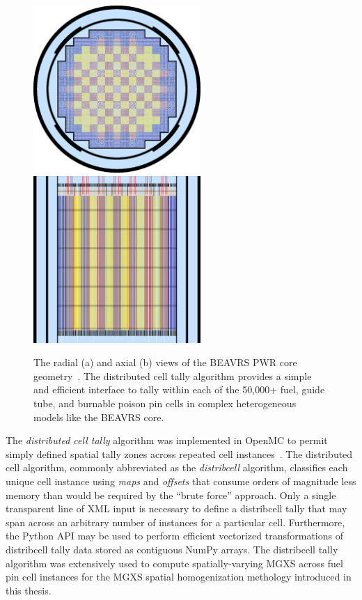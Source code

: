 \begin{figure}[h!]
  \centering
  \includegraphics[width=2.5in]{figures/workflow/openmc/core}\hspace{1cm}
  \includegraphics[width=2.5in]{figures/workflow/openmc/core_axial}
\caption[Radial and axial views of the BEAVRS core]{The radial (a) and axial (b) views of the BEAVRS \ac{PWR} core geometry~\cite{horelik2013beavrs}. The distributed cell tally algorithm provides a simple and efficient interface to tally within each of the 50,000+ fuel, guide tube, and burnable poison pin cells in complex heterogeneous models like the \ac{BEAVRS} core.}
\label{fig:beavrs}
\end{figure}

The \textit{distributed cell tally} algorithm was implemented in OpenMC to permit simply defined spatial tally zones across repeated cell instances~\cite{lax2014distribcell}. The distributed cell algorithm, commonly abbreviated as the \textit{distribcell} algorithm, classifies each unique cell instance using \textit{maps} and \textit{offsets} that consume orders of magnitude less memory than would be required by the ``brute force'' approach. Only a single transparent line of \ac{XML} input is necessary to define a distribcell tally that may span across an arbitrary number of instances for a particular cell. Furthermore, the Python \ac{API} may be used to perform efficient vectorized transformations of distribcell tally data stored as contiguous NumPy arrays. The distribcell tally algorithm was extensively used to compute spatially-varying \ac{MGXS} across fuel pin cell instances for the \ac{MGXS} spatial homogenization methology introduced in this thesis.

